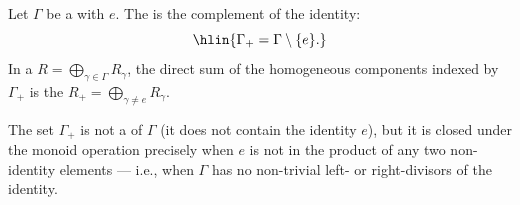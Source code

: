 \begin{definition} \label{definition:non_identity_degrees_of_a_monoid}
    Let $\Gamma$ be a  with  $e$.
    The  is the complement of the identity:
    $$\hlin{\Gamma_+ = \Gamma \setminus \{e\}.}$$
    In a  $R = \bigoplus_{\gamma \in \Gamma} R_\gamma$, the direct sum of the homogeneous components indexed by $\Gamma_+$ is the  $R_+ = \bigoplus_{\gamma \neq e} R_\gamma$.

    The set $\Gamma_+$ is not a  of $\Gamma$ (it does not contain the identity $e$), but it is closed under the monoid operation precisely when $e$ is not in the product of any two non-identity elements — i.e., when $\Gamma$ has no non-trivial left- or right-divisors of the identity.
\end{definition}